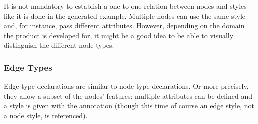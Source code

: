 \documentclass[a4paper,american,12pt]{scrreprt}
\begin{document}

It is not mandatory to establish a one-to-one relation between nodes and styles
like it is done in the generated example. Multiple nodes can use the same style 
and, for instance, pass different attributes. However, depending on the domain
the \cinco product is developed for, it might be a good idea to be able to
visually distinguish the different node types.


\subsubsection{Edge Types}

Edge type declarations are similar to node type declarations. Or more precisely,
they allow a subset of the nodes' features: multiple attributes can be defined
and a style is given with the  annotation (though this time of
course an edge style, not a node style, is referenced).
\end{document}
